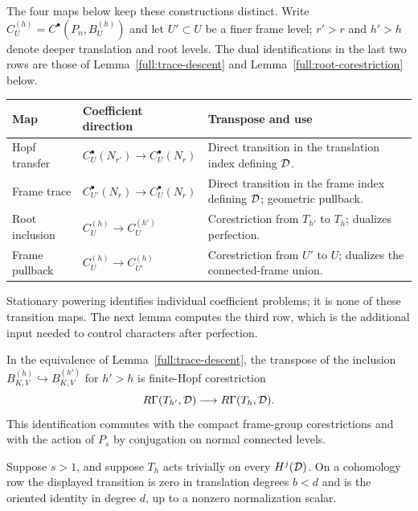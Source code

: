 The four maps below keep these constructions distinct.  Write
$C_U^{(h)}=C^\bullet(P_n,B_U^{(h)})$ and let $U'\subset U$ be a
finer frame level; $r'>r$ and $h'>h$ denote deeper translation and
root levels.  The dual identifications in the last two rows
are those of Lemma~\ref{full:trace-descent} and
Lemma~\ref{full:root-corestriction} below.
\begin{center}
\renewcommand{\arraystretch}{1.2}
\begin{tabular}{@{}p{}p{}p{}@{}}
\toprule
Map & Coefficient direction & Transpose and use\\
\midrule
Hopf transfer &
$C_U^\bullet(N_{r'})\to C_U^\bullet(N_r)$ &
Direct transition in the translation index defining $\mathcal D$.\\
Frame trace &
$C_{U'}^\bullet(N_r)\to C_U^\bullet(N_r)$ &
Direct transition in the frame index defining $\mathcal D$; geometric pullback.\\
Root inclusion &
$C_U^{(h)}\to C_U^{(h')}$ &
Corestriction from $T_{h'}$ to $T_h$; dualizes perfection.\\
Frame pullback &
$C_U^{(h)}\to C_{U'}^{(h)}$ &
Corestriction from $U'$ to $U$; dualizes the connected-frame union.\\
\bottomrule
\end{tabular}
\end{center}
Stationary powering identifies individual coefficient problems; it is
none of these transition maps.  The next lemma computes the third row,
which is the additional input needed to control characters after
perfection.

\begin{lemma}
\label{full:root-corestriction}
In the equivalence of Lemma~\ref{full:trace-descent}, the transpose of
the inclusion
$B_{K,V}^{(h)}\hookrightarrow B_{K,V}^{(h')}$
for $h'>h$ is finite-Hopf corestriction
\[
 R\Gamma(T_{h'},\mathcal D)\longrightarrow R\Gamma(T_h,\mathcal D).
\]
This identification commutes with the compact frame-group
corestrictions and with the action of $P_s$ by conjugation on
normal connected levels.

Suppose $s>1$, and suppose $T_h$ acts trivially on every $H^j(\mathcal D)$.
On a cohomology row the displayed transition is zero in
translation degrees $b<d$ and is the oriented identity in degree
$d$, up to a nonzero normalization scalar.
\end{lemma}

